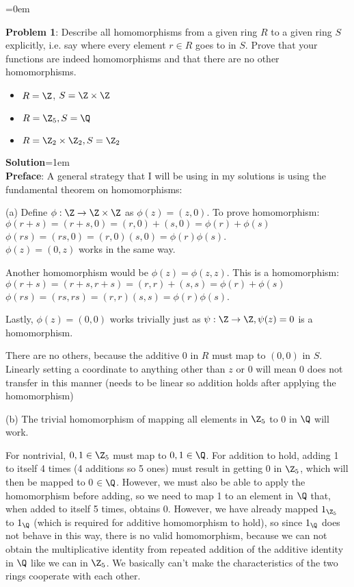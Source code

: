 \documentclass{article}
\begin{document}
\newpage\parskip=0em
\begin{mdframed}[backgroundcolor=blue!20]
\textbf{Problem 1}: Describe all homomorphisms from a given ring $R$ to a given ring $S$ explicitly, i.e. say where every element $r\in R$ goes to in $S$. Prove that your functions are indeed homomorphisms and that there are no other homomorphisms.
\begin{itemize}
    \item $R = \Z$, $S = \Z \times \Z$
    \item $R = \Z_5, S = \Q$
    \item $R = \Z_2 \times \Z_2, S = \Z_2$
\end{itemize}
\end{mdframed}
\textbf{Solution}\parskip=1em\\
\textbf{Preface}: A general strategy that I will be using in my solutions is using the fundamental theorem on homomorphisms: 

(a) Define $\phi: \Z \to \Z\times \Z$ as $\phi(z) = (z, 0)$. To prove homomorphism: \\
$\phi(r + s) = (r + s, 0) = (r, 0) + (s, 0) = \phi(r) + \phi(s)$\\
$\phi(rs) = (rs, 0) = (r, 0)(s, 0) = \phi(r)\phi(s)$.\\
$\phi(z) = (0, z)$ works in the same way.

Another homomorphism would be $\phi(z) = \phi(z, z)$. This is a homomorphism:
$\phi(r + s) = (r + s, r + s) = (r, r) + (s, s) = \phi(r) + \phi(s)$\\
$\phi(rs) = (rs, rs) = (r, r)(s, s) = \phi(r)\phi(s)$.

Lastly, $\phi(z) = (0, 0)$ works trivially just as $\psi: \Z \to \Z, \psi(z) = 0$ is a homomorphism.

There are no others, because the additive 0 in $R$ must map to $(0, 0)$ in $S$. Linearly setting a coordinate to anything other than $z$ or 0 will mean 0 does not transfer in this manner (needs to be linear so addition holds after applying the homomorphism)

(b) The trivial homomorphism of mapping all elements in $\Z_5$ to 0 in $\Q$ will work.

For nontrivial, $0, 1\in \Z_5$ must map to $0, 1 \in \Q$. For addition to hold, adding 1 to itself 4 times (4 additions so 5 ones) must result in getting 0 in $\Z_5$, which will then be mapped to 0 $\in \Q$. However, we must also be able to apply the homomorphism before adding, so we need to map 1 to an element in $\Q$ that, when added to itself 5 times, obtains 0. However, we have already mapped $1_{\Z_5}$ to $1_\Q$ (which is required for additive homomorphism to hold), so since $1_\Q$ does not behave in this way, there is no valid homomorphism, because we can not obtain the multiplicative identity from repeated addition of the additive identity in $\Q$ like we can in $\Z_5$. We basically can't make the characteristics of the two rings cooperate with each other.
\end{document}

